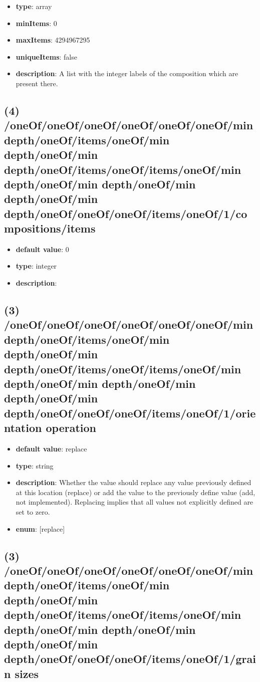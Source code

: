 \begin{itemize}[leftmargin=3em]\item {\bf type}: array
\item {\bf minItems}: 0
\item {\bf maxItems}: 4294967295
\item {\bf uniqueItems}: false
\item {\bf description}: A list with the integer labels of the composition which are present there.
\end{itemize}\subsection{(4) /oneOf/oneOf/oneOf/oneOf/oneOf/oneOf/min depth/oneOf/items/oneOf/min depth/oneOf/min depth/oneOf/items/oneOf/items/oneOf/min depth/oneOf/min depth/oneOf/min depth/oneOf/min depth/oneOf/oneOf/oneOf/items/oneOf/1/compositions/items}
\begin{itemize}[leftmargin=4em]\item {\bf default value}: 0
\item {\bf type}: integer
\item {\bf description}: 
\end{itemize}\subsection{(3) /oneOf/oneOf/oneOf/oneOf/oneOf/oneOf/min depth/oneOf/items/oneOf/min depth/oneOf/min depth/oneOf/items/oneOf/items/oneOf/min depth/oneOf/min depth/oneOf/min depth/oneOf/min depth/oneOf/oneOf/oneOf/items/oneOf/1/orientation operation}
\begin{itemize}[leftmargin=3em]\item {\bf default value}: replace
\item {\bf type}: string
\item {\bf description}: Whether the value should replace any value previously defined at this location (replace) or add the value to the previously define value (add, not implemented). Replacing implies that all values not explicitly defined are set to zero.
\item {\bf enum}: [replace]\end{itemize}\subsection{(3) /oneOf/oneOf/oneOf/oneOf/oneOf/oneOf/min depth/oneOf/items/oneOf/min depth/oneOf/min depth/oneOf/items/oneOf/items/oneOf/min depth/oneOf/min depth/oneOf/min depth/oneOf/min depth/oneOf/oneOf/oneOf/items/oneOf/1/grain sizes}
